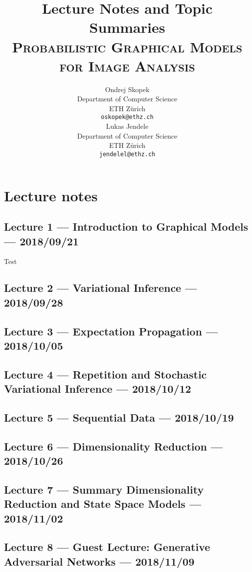 \documentclass{article}
\title{Lecture Notes and Topic Summaries\\{\normalfont\large \textsc{Probabilistic Graphical Models for Image Analysis}}}
\author{
  Ondrej Skopek\\
  Department of Computer Science\\
  ETH Z\"{u}rich\\
  \texttt{oskopek@ethz.ch}\\
  \And
  Lukas Jendele\\
  Department of Computer Science\\
  ETH Z\"{u}rich\\
  \texttt{jendelel@ethz.ch}\\
}
\begin{document}
\maketitle

\section{Lecture notes}

\subsection{Lecture 1 --- Introduction to Graphical Models --- 2018/09/21}

Test

\subsection{Lecture 2 --- Variational Inference --- 2018/09/28}

\subsection{Lecture 3 --- Expectation Propagation --- 2018/10/05}

\subsection{Lecture 4 --- Repetition and Stochastic Variational Inference --- 2018/10/12}

\subsection{Lecture 5 --- Sequential Data --- 2018/10/19}

\subsection{Lecture 6 --- Dimensionality Reduction --- 2018/10/26}

\subsection{Lecture 7 --- Summary Dimensionality Reduction and State Space Models --- 2018/11/02}

\subsection{Lecture 8 --- Guest Lecture: Generative Adversarial Networks --- 2018/11/09}
\end{document}
